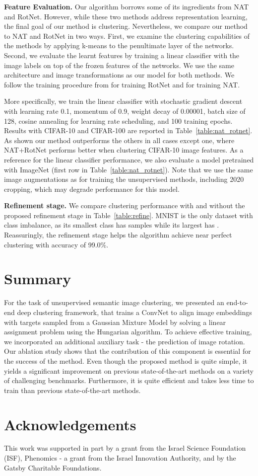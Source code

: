 \documentclass[a4paper,conference]{IEEEtran}
\begin{document}
\textbf{Feature Evaluation.}
Our algorithm borrows some of its ingredients from NAT and RotNet. However, while these two methods address representation learning, the final goal of our method is clustering. Nevertheless, we compare our method to NAT and RotNet in two ways. First, we examine the clustering capabilities of the methods by applying k-means to the penultimate layer of the networks. Second, we evaluate the learnt features by training a linear classifier with the image labels on top of the frozen features of the networks. We use the same architecture and image transformations as our model for both methods. We follow the training procedure from \cite{kolesnikov2019revisiting} for training RotNet and \cite{BJ2017} for training NAT. 

More specifically, we train the linear classifier with stochastic gradient descent with learning rate 0.1, momentum of 0.9, weight decay of 0.00001, batch size of 128, cosine annealing for learning rate scheduling, and 100 training epochs. Results with CIFAR-10 and CIFAR-100 are reported in Table~\ref{table:nat_rotnet}. As shown our method outperforms the others in all cases except one, where NAT+RotNet performs better when clustering CIFAR-10 image features. As a reference for the linear classifier performance, we also evaluate a model pretrained with ImageNet (first row in Table~\ref{table:nat_rotnet}). Note that we use the same image augmentations as for training the unsupervised methods, including 2020 cropping, which may degrade performance for this model.

\textbf{Refinement stage.} We compare clustering performance with and without the proposed refinement stage in Table~\ref{table:refine}. MNIST is the only dataset with class imbalance, as its smallest class has  samples while its largest has . Reassuringly, the refinement stage helps the algorithm achieve near perfect clustering with accuracy of 99.0\%.


\section{Summary}
For the task of unsupervised semantic image clustering, we presented an end-to-end deep clustering framework, that trains a ConvNet to align image embeddings with targets sampled from a Gaussian Mixture Model by solving a linear assignment problem using the Hungarian algorithm. To achieve effective training, we incorporated an additional auxiliary task - the prediction of image rotation. Our ablation study shows that the contribution of this component is essential for the success of the method. Even though the proposed method is quite simple, it yields a significant improvement on previous state-of-the-art methods on a variety of challenging benchmarks. Furthermore, it is quite efficient and takes less time to train than previous state-of-the-art methods.


\section*{Acknowledgements}
This work was supported in part by a grant from the Israel Science Foundation (ISF), Phenomics - a grant from the Israel Innovation Authority, and by the Gatsby Charitable Foundations.



\end{document}
